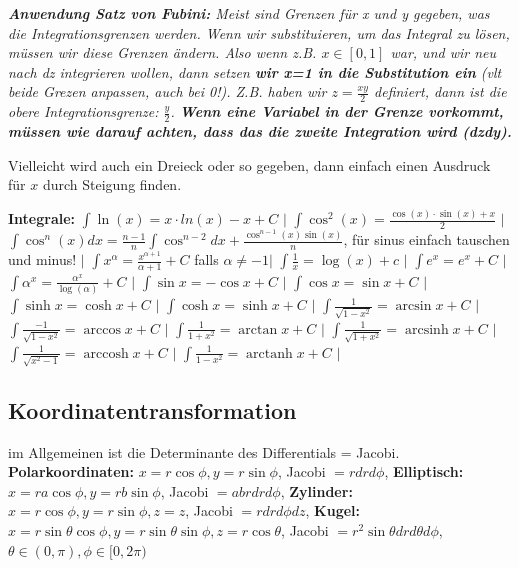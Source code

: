 \documentclass[a3paper, ngerman, 8pt]{article}
\DeclareMathOperator{\arcsinh}{arcsinh}
\DeclareMathOperator{\arccosh}{arccosh}
\DeclareMathOperator{\arctanh}{arctanh}
\begin{document}
\begin{multicols*}{3}
\textit{\textbf{Anwendung Satz von Fubini:} Meist sind Grenzen für x und y gegeben, was die Integrationsgrenzen werden. Wenn wir substituieren, um das Integral zu lösen, müssen wir diese Grenzen ändern. Also wenn z.B. $x\in [0,1]$ war, und wir neu nach dz integrieren wollen, dann setzen \textbf{wir x=1 in die Substitution ein} (vlt beide Grezen anpassen, auch bei 0!). Z.B. haben wir $z=\frac{xy}{2}$ definiert, dann ist die obere Integrationsgrenze: $\frac{y}{2}$. \textbf{Wenn eine Variabel in der Grenze vorkommt, müssen wie darauf achten, dass das die zweite Integration wird (dzdy). }}

Vielleicht wird auch ein Dreieck oder so gegeben, dann einfach einen Ausdruck für $x$ durch Steigung finden. 

\textbf{Integrale:} 
$\int \ln(x)=x\cdot ln(x) - x + C$ $\big \vert$ 
$\int \cos^2(x)=\frac{\cos(x)\cdot \sin(x) + x}{2}$ $\big \vert$ 
$\int \cos^n(x)dx=\frac{n-1}{n}\int \cos^{n-2}dx+\frac{\cos^{n-1}(x)\sin(x)}{n}$,
für sinus einfach tauschen und minus! $\big \vert$
$\int x^{\alpha} = \frac{x^{\alpha + 1}}{\alpha + 1} + C$ falls $\alpha \neq -1 \big \vert$
$\int \frac{1}{x} = \log (x) + c$ $\big \vert$
$\int e^x = e^x + C$ $\big \vert$
$\int \alpha^{x} = \frac{\alpha^{x}}{\log (\alpha)} + C$ $\big \vert$
$\int \sin x = -\cos x + C$ $\big \vert$
$\int \cos x = \sin x + C$ $\big \vert$
$\int \sinh x = \cosh x + C$ $\big \vert$
$\int \cosh x = \sinh x + C$ $\big \vert$
$\int \frac{1}{\sqrt{1 - x^2}} = \arcsin x + C$ $\big \vert$ %
$\int \frac{-1}{\sqrt{1 - x^2}} = \arccos x + C$ $\big \vert$
$\int \frac{1}{1 + x^2} = \arctan x + C$ $\big \vert$
$\int \frac{1}{\sqrt{1 + x^2}} = \arcsinh x + C$ $\big \vert$
$\int \frac{1}{\sqrt{x^2 - 1}} = \arccosh x + C$ $\big \vert$
$\int \frac{1}{1 - x^2} = \arctanh x + C$ $\big \vert$


\subsection*{Koordinatentransformation}
im Allgemeinen ist die Determinante des Differentials = Jacobi. 
\textbf{Polarkoordinaten: } $x= r \cos\phi, y=r \sin\phi$, Jacobi $=rdrd\phi$, 
\textbf{Elliptisch:} $x=r a \cos\phi, y = r b \sin\phi$, Jacobi $=abrdrd\phi$,
\textbf{Zylinder:} $x=r \cos\phi, y=r \sin\phi, z=z$, Jacobi $=rdrd\phi dz$,
\textbf{Kugel:} $x=r \sin\theta \cos\phi, y=r \sin\theta \sin\phi, z=r \cos\theta$,
Jacobi $=r^2 \sin\theta drd\theta d\phi$, $\theta \in (0,\pi), \phi \in [0,2\pi)$


\end{multicols*}
\end{document}
